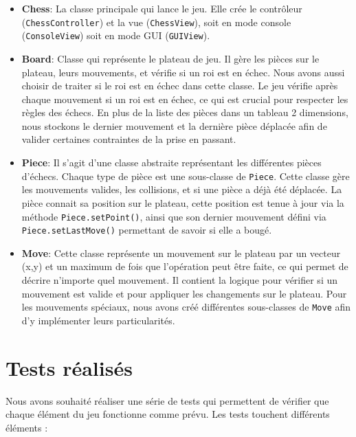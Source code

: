 \documentclass[12pt]{article}
\begin{document}
\begin{itemize}
    \item \textbf{Chess}: La classe principale qui lance le jeu. Elle crée le contrôleur (\texttt{ChessController}) et la vue (\texttt{ChessView}), soit en mode console (\texttt{ConsoleView}) soit en mode GUI (\texttt{GUIView}).
    \item \textbf{Board}: Classe qui représente le plateau de jeu. Il gère les pièces sur le plateau, leurs mouvements, et vérifie si un roi est en échec. Nous avons aussi choisir de traiter si le roi est en échec dans cette classe. Le jeu vérifie après chaque mouvement si un roi est en échec, ce qui est crucial pour respecter les règles des échecs. En plus de la liste des pièces dans un tableau 2 dimensions, nous stockons le dernier mouvement et la dernière pièce déplacée afin de valider certaines contraintes de la prise en passant.
    \item \textbf{Piece}: Il s'agit d'une classe abstraite représentant les différentes pièces d'échecs. Chaque type de pièce est une sous-classe de \texttt{Piece}. Cette classe gère les mouvements valides, les collisions, et si une pièce a déjà été déplacée. La pièce connait sa position sur le plateau, cette position est tenue à jour via la méthode \texttt{Piece.setPoint()}, ainsi que son dernier mouvement défini via \texttt{Piece.setLastMove()} permettant de savoir si elle a bougé.
    \item \textbf{Move}: Cette classe représente un mouvement sur le plateau par un vecteur (x,y) et un maximum de fois que l'opération peut être faite, ce qui permet de décrire n'importe quel mouvement. Il contient la logique pour vérifier si un mouvement est valide et pour appliquer les changements sur le plateau. Pour les mouvements spéciaux, nous avons créé différentes sous-classes de \texttt{Move} afin d'y implémenter leurs particularités.
\end{itemize}

\section{Tests réalisés}
Nous avons souhaité réaliser une série de tests qui permettent de vérifier que chaque élément du jeu fonctionne comme prévu. Les tests touchent différents éléments :
\end{document}
